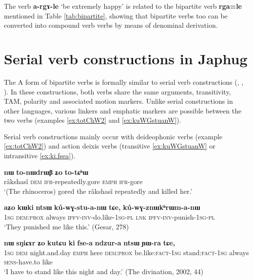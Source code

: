 \documentclass[oneside,a4paper,11pt]{article}
\newcommand{\ipa}[1]{{\phon\textbf{#1}}}
\newcommand{\jpg}[2]{\ipa{#1} `#2'}
\begin{document}
The verb \jpg{a-rgɤ-le}{be extremely happy} is related to the bipartite verb \ipa{rga=le} mentioned in Table \ref{tab:bipartite}, showing that bipartite verbs too can be converted into compound verb verbs by means of denominal derivation.

\section{Serial verb constructions in Japhug} \label{sec:serial}
The A form of bipartite verbs is formally similar to serial verb constructions (\citealt{sun12complementation}, \citealt{jacques13harmonization}, \citealt{jacques16complementation}). In these constructions, both verbs share the same arguments, transitivity, TAM, polarity and associated motion markers. Unlike serial constructions in other languages, various linkers and emphatic markers are possible between the two verbs (examples \ref{ex:totChW2} and \ref{ex:kuWGstuanW}).

Serial verb constructions mainly occur with deideophonic verbs (example \ref{ex:totChW2}) and action deixis verbs (transitive \ref{ex:kuWGstuanW} or intransitive \ref{ex:ki.fsea}).

\begin{exe}
\ex \label{ex:totChW2}
\gll 	\ipa{srɯnmɯ} 	\ipa{nɯ} 	\ipa{to-nɯdrɯβ} 	\ipa{ʑo} 	 	\ipa{to-tɕʰɯ} \\
 râkshasî \textsc{dem}  \textsc{ifr}-repeatedly.gore  \textsc{emph}  \textsc{ifr}-gore \\
 \glt `(The rhinoceros) gored the râkshasî repeatedly and killed her.' 
\end{exe}	

\begin{exe}
\ex \label{ex:kuWGstuanW}
\gll 	
 \ipa{aʑo} 	\ipa{kɯki} 	\ipa{ntsɯ} 	\ipa{kú-wɣ-stu-a-nɯ} 	\ipa{tɕe,} 	\ipa{kú-wɣ-znɯkʰrɯm-a-nɯ} \\
 \textsc{1sg} \textsc{dem:prox} always \textsc{ipfv-inv}-do.like-\textsc{1sg-pl} \textsc{lnk} \textsc{ipfv-inv}-punish-\textsc{1sg-pl} \\
 \glt `They punished me like this.' (Gesar, 278)
\end{exe}	

\begin{exe}
\ex \label{ex:ki.fsea}
\gll \ipa{aʑo} 	\ipa{nɯ} 	\ipa{sŋiɕɤr} 	\ipa{ʑo} 	\ipa{kutɕu} 	\ipa{ki} 	\ipa{fse-a} 	\ipa{ndzur-a} 	\ipa{ntsɯ} 	\ipa{ɲɯ-ra} 	\ipa{tɕe,} \\
\textsc{1sg} \textsc{dem} night.and.day \textsc{emph} here \textsc{dem:prox} be.like:\textsc{fact-1sg} stand:\textsc{fact-1sg} always \textsc{sens}-have.to like \\
\glt `I have to stand like this night and day.' (The divination, 2002, 44)
\end{exe}
\end{document}
